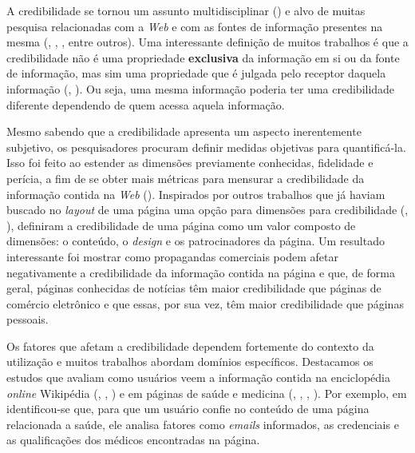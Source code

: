 A credibilidade se tornou um assunto multidisciplinar (\cite{Rieh07}) e alvo de muitas pesquisa relacionadas com a \textit{Web} e com as fontes de informação presentes na mesma (\cite{Sundar99}, \cite{Freeman04}, \cite{Flanagin07}, entre outros).
Uma interessante definição de muitos trabalhos é que a credibilidade não é uma propriedade \textbf{exclusiva} da informação em si ou da fonte de informação, mas sim uma propriedade que é julgada pelo receptor daquela informação (\cite{Sundar99}, \cite{Freeman04}). Ou seja, uma mesma informação poderia ter uma credibilidade diferente dependendo de quem acessa aquela informação.

Mesmo sabendo que a credibilidade apresenta um aspecto inerentemente subjetivo, os pesquisadores procuram definir medidas objetivas para quantificá-la. Isso foi feito ao estender as dimensões previamente conhecidas, fidelidade e perícia, a fim de se obter mais métricas para mensurar a credibilidade da informação contida na \textit{Web} (\cite{Flanagin07}). 
Inspirados por outros trabalhos que já haviam buscado no \textit{layout} de uma página uma opção para dimensões para credibilidade
 (\cite{Palmer00}, \cite{Fogg01}), \cite{Flanagin07} definiram a credibilidade de uma página como um valor composto de dimensões: o conteúdo, o \textit{design} e os patrocinadores da página. Um resultado interessante foi mostrar como propagandas comerciais podem afetar negativamente a credibilidade da informação contida na página e que, de forma geral, páginas conhecidas de notícias têm maior credibilidade que páginas de comércio eletrônico e que essas, por sua vez, têm maior credibilidade que páginas pessoais.

Os fatores que afetam a credibilidade dependem fortemente do contexto da utilização e muitos trabalhos abordam domínios específicos.
Destacamos os estudos que avaliam como usuários veem a informação contida na enciclopédia \textit{online} Wikipédia (\cite{Chesney06}, \cite{Lopes08}, \cite{Kubiszewski11}) e em páginas de saúde e medicina (\cite{Linderg98}, \cite{Eastin01}, \cite{Eysenbach02}, \cite{Rains09}). Por exemplo, em \cite{Eysenbach02} 
identificou-se que, para que um usuário confie no conteúdo de uma página relacionada a saúde, ele analisa fatores como \textit{emails} informados, as credenciais e as qualificações dos médicos encontradas na página.

